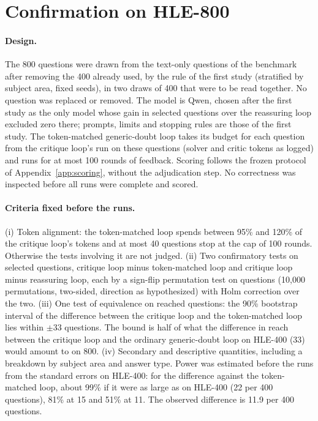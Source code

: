 \documentclass[11pt]{article}
\newcommand{\qw}{Qwen}
\begin{document}
\section{Confirmation on HLE-800}
\label{app:confirm}

\paragraph{Design.}
The 800 questions were drawn from the text-only questions of the benchmark after removing the 400 already used, by the rule of the first study (stratified by subject area, fixed seeds), in two draws of 400 that were to be read together.
No question was replaced or removed.
The model is \qw, chosen after the first study as the only model whose gain in selected questions over the reassuring loop excluded zero there; prompts, limits and stopping rules are those of the first study.
The token-matched generic-doubt loop takes its budget for each question from the critique loop's run on these questions (solver and critic tokens as logged) and runs for at most 100 rounds of feedback.
Scoring follows the frozen protocol of Appendix~\ref{app:scoring}, without the adjudication step.
No correctness was inspected before all runs were complete and scored.

\paragraph{Criteria fixed before the runs.}
(i) Token alignment: the token-matched loop spends between 95\% and 120\% of the critique loop's tokens and at most 40 questions stop at the cap of 100 rounds. Otherwise the tests involving it are not judged.
(ii) Two confirmatory tests on selected questions, critique loop minus token-matched loop and critique loop minus reassuring loop, each by a sign-flip permutation test on questions (10,000 permutations, two-sided, direction as hypothesized) with Holm correction over the two.
(iii) One test of equivalence on reached questions: the 90\% bootstrap interval of the difference between the critique loop and the token-matched loop lies within $\pm 33$ questions. The bound is half of what the difference in reach between the critique loop and the ordinary generic-doubt loop on HLE-400 (33) would amount to on 800.
(iv) Secondary and descriptive quantities, including a breakdown by subject area and answer type.
Power was estimated before the runs from the standard errors on HLE-400: for the difference against the token-matched loop, about 99\% if it were as large as on HLE-400 (22 per 400 questions), 81\% at 15 and 51\% at 11. The observed difference is 11.9 per 400 questions.
\end{document}
